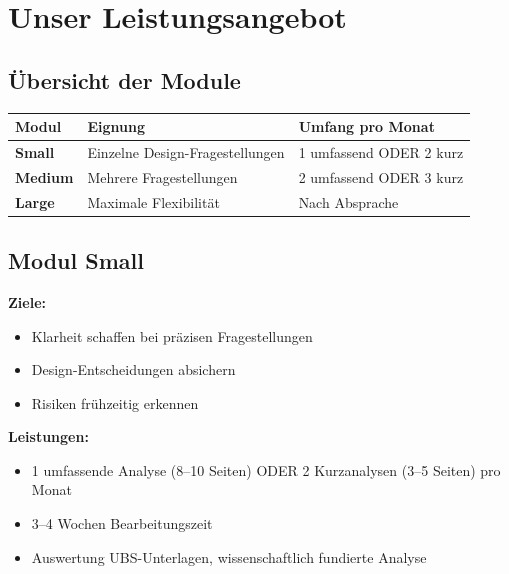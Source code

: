 \documentclass[11pt,a4paper]{article}
\newcommand{\fahead}[1]{\textcolor{fawhite}{\bfseries #1}}
\begin{document}
\newpage
\section{Unser Leistungsangebot}

\subsection{Übersicht der Module}

\begin{center}
\begin{tabular}{p{2.5cm}p{5.5cm}p{5cm}}
\toprule
\rowcolor{fadarkblue}
\fahead{Modul} & \fahead{Eignung} & \fahead{Umfang pro Monat} \\
\midrule
\rowcolor{fawhite}
\textbf{Small} & Einzelne Design-Fragestellungen & 1 umfassend ODER 2 kurz \\
\rowcolor{falightgray}
\textbf{Medium} & Mehrere Fragestellungen & 2 umfassend ODER 3 kurz \\
\rowcolor{fawhite}
\textbf{Large} & Maximale Flexibilität & Nach Absprache \\
\bottomrule
\end{tabular}
\end{center}

\vspace{1cm}

\subsection{Modul Small}

\textbf{Ziele:}
\begin{itemize}
    \item[$\checkmark$] Klarheit schaffen bei präzisen Fragestellungen
    \item[$\checkmark$] Design-Entscheidungen absichern
    \item[$\checkmark$] Risiken frühzeitig erkennen
\end{itemize}

\textbf{Leistungen:}
\begin{itemize}
    \item 1 umfassende Analyse (8--10 Seiten) ODER 2 Kurzanalysen (3--5 Seiten) pro Monat
    \item 3--4 Wochen Bearbeitungszeit
    \item Auswertung UBS-Unterlagen, wissenschaftlich fundierte Analyse
\end{itemize}
\end{document}
